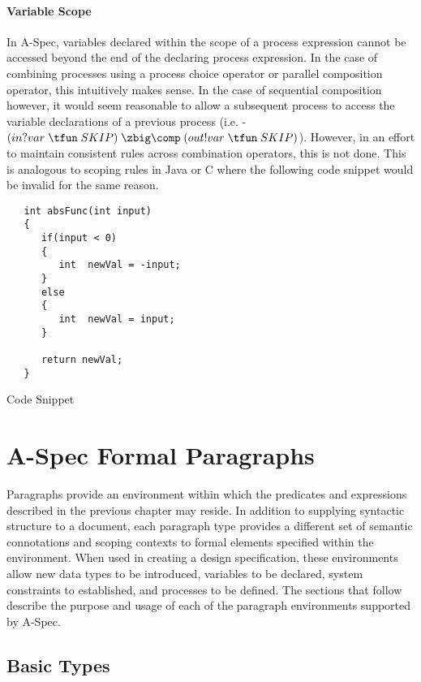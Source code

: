 \documentclass[letterpaper,10pt,draft]{book}
\begin{document}
\subsubsection{Variable Scope}
   \label{sect:ProcCombScope}

In A-Spec, variables declared within the scope of a process expression cannot be
accessed beyond the end of the declaring process expression.  In the case of combining
processes using a process choice operator or parallel composition operator, this
intuitively makes sense.  In the case of sequential composition however, it would
seem reasonable to allow a subsequent process to access the variable declarations
of a previous process (i.e. - $(in?var \mathrel{\pthen} SKIP) \mathrel{\zbig\comp}
(out!var \mathrel{\pthen} SKIP)$).  However, in an effort to maintain consistent
rules across combination operators, this is not done.  This is analogous to scoping
rules in Java or C where the following code snippet would be invalid for the same
reason.

\begin{example}
\begin{verbatim}
   int absFunc(int input)
   {
      if(input < 0)
      {
         int  newVal = -input;
      }
      else
      {
         int  newVal = input;
      }

      return newVal;
   }
\end{verbatim}

   \caption{Code Snippet}
   \label{ex:ScopeSnippet}
\end{example}

\chapter{A-Spec Formal Paragraphs}
   \label{ch:Paragraphs}

Paragraphs provide an environment within which the predicates and expressions described
in the previous chapter may reside.  In addition to supplying syntactic structure
to a document, each paragraph type provides a different set of semantic connotations
and scoping contexts to formal elements specified within the environment.  When
used in creating a design specification, these environments allow new data types
to be introduced, variables to be declared, system constraints to established, and
processes to be defined.  The sections that follow describe the purpose and usage
of each of the paragraph environments supported by A-Spec.

\section{Basic Types}
   \label{sect:Basic}
\end{document}
